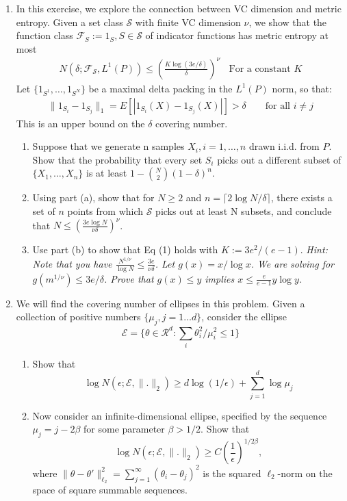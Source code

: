 \documentclass[11pt]{article}
\newcommand{\F}{\mathcal{F}}
\newcommand{\R}{\mathcal{R}}
\renewcommand{\S}{\mathcal{S}}
\begin{document}
\begin{enumerate}
\item In this exercise, we explore the connection between VC dimension and
metric entropy. Given a set class $\S$ with finite VC dimension $\nu$, we show that the
function class $\F_S := {1_S, S \in \S}$ of indicator functions has metric entropy at most
\begin{align}
N(\delta;\F_\S,L^1(P))\leq \left(\frac{K\log(3e/\delta)}{\delta}\right)^{\nu}\ \ \ \ \mbox{For a constant $K$}
\end{align}
Let $\{1_{S^1},\dots,1_{S^N}\}$ be a maximal delta packing in the $L^1(P)$ norm, so that:
\begin{align*}
\|1_{S_i}-1_{S_j}\|_1=E[|1_{S_i}(X)-1_{S_j}(X)|]>\delta \qquad \mbox{for all $i\neq j$}
\end{align*}
This is an upper bound on the $\delta$ covering number.
\begin{enumerate}
	\item Suppose that we generate n samples $X_i, i = 1, \dots , n$ drawn i.i.d. from $P$. Show 
that the probability that every set $S_i$ picks out a different subset of $\{X_1,\dots, X_n\}$ is at least $1-{N\choose 2}(1-\delta)^n$.
\item Using part (a), show that for $N \geq 2$ and $n = \lceil 2 \log N/\delta\rceil$, there exists a set of $n$ points
from which $\S$ picks out at least N subsets, and conclude that $N \leq \left(\frac{3e \log N}{\nu\delta}\right)^\nu$.
\item Use part (b) to show that Eq (1) holds with $K:=3e^2/(e-1)$.
\textit{Hint: Note that you have $\frac{N^{1/\nu}}{\log N}\leq \frac{3e}{\nu\delta}$. Let $g(x)=x/\log x$. We are solving for $g(m^{1/\nu})\leq 3e/\delta$. Prove that $g(x)\leq y$ implies $x\leq \frac{e}{e-1}y\log y$.}
\end{enumerate}
\item We will find the covering number of ellipses in this problem.  Given a collection of positive numbers $\{\mu_j,j=1\dots d\}$, consider the ellipse $$\mathcal{E}=\{\theta\in\R^d : \sum_i \theta_i^2/\mu_i^2\leq 1\}$$
\begin{enumerate}
	\item Show that $$\log N(\epsilon; \mathcal{E},\|.\|_2)\geq d\log (1/\epsilon)+\sum_{j=1}^d\log \mu_j$$
	\item Now consider an infinite-dimensional ellipse, specified by the sequence $\mu_j = j-2\beta$
for some parameter $\beta > 1/2$. Show that
$$\log N(\epsilon; \mathcal{E},\|.\|_2)\geq C \left(\frac{1}{\epsilon}\right)^{1/2\beta},$$
where $\|\theta-\theta'\|_{\ell_2}^2=\sum_{j=1}^\infty (\theta_i-\theta_j)^2$ is the squared $\ell_2$-norm on the space of square summable sequences.
\end{enumerate}
\begin{comment}
\item For any fixed $\theta$, define the real-valued 
function $f_\theta(x) := 1 − \exp(-\theta|x|)$, and consider the function class
$$\F=\{f_\theta:[0,1]\rightarrow \R | \theta\in[0,1]	\}$$
Using the uniform norm as a metric, i.e. 


\end{comment}
\end{enumerate}
\end{document}
